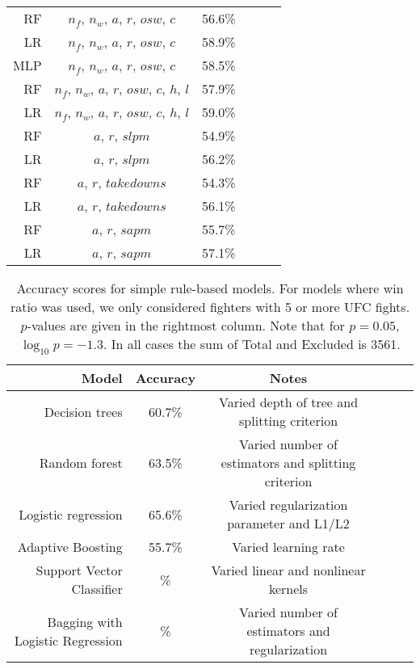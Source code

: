 \begin{center}
\begin{table}[h]
\begin{tabular}{r|ccccc}
RF & $n_f$, $n_w$, $a$, $r$, $osw$, $c$ & 56.6\% \\
LR & $n_f$, $n_w$, $a$, $r$, $osw$, $c$ & 58.9\% \\
MLP & $n_f$, $n_w$, $a$, $r$, $osw$, $c$ & 58.5\% \\
RF & $n_f$, $n_w$, $a$, $r$, $osw$, $c$, $h$, $l$ & 57.9\% \\
LR & $n_f$, $n_w$, $a$, $r$, $osw$, $c$, $h$, $l$ & 59.0\% \\
RF & $a$, $r$, $slpm$ & 54.9\% \\
LR & $a$, $r$, $slpm$ & 56.2\% \\
RF & $a$, $r$, $takedowns$ & 54.3\% \\
LR & $a$, $r$, $takedowns$ & 56.1\% \\
RF & $a$, $r$, $sapm$ & 55.7\% \\
LR & $a$, $r$, $sapm$ & 57.1\% \\
\bottomrule
\end{tabular}
\caption{}
\label{other_features}
\end{table}
\end{center}



\begin{center}
\begin{table}[h]
\begin{tabular}{r|ccccc}
  \toprule
  Model & Accuracy & Notes\\
  \hline
  Decision trees & 60.7\% & Varied depth of tree and splitting criterion\\
  Random forest & 63.5\% & Varied number of estimators and splitting criterion\\
  Logistic regression & 65.6\% & Varied regularization parameter and L1/L2\\
  Adaptive Boosting & 55.7\% & Varied learning rate\\
  Support Vector Classifier & \% & Varied linear and nonlinear kernels\\
  Bagging with Logistic Regression & \% & Varied number of estimators and regularization\\
  \bottomrule
\end{tabular}
\caption{Accuracy scores for simple rule-based models. For models where win ratio was used, we only considered
fighters with 5 or more UFC fights. $p$-values are given in the rightmost column. Note that for $p=0.05$, $\log_{10}p = -1.3$. In all
cases the sum of
Total and Excluded is 3561.}
\label{table_ML_models}
\end{table}
\end{center}

